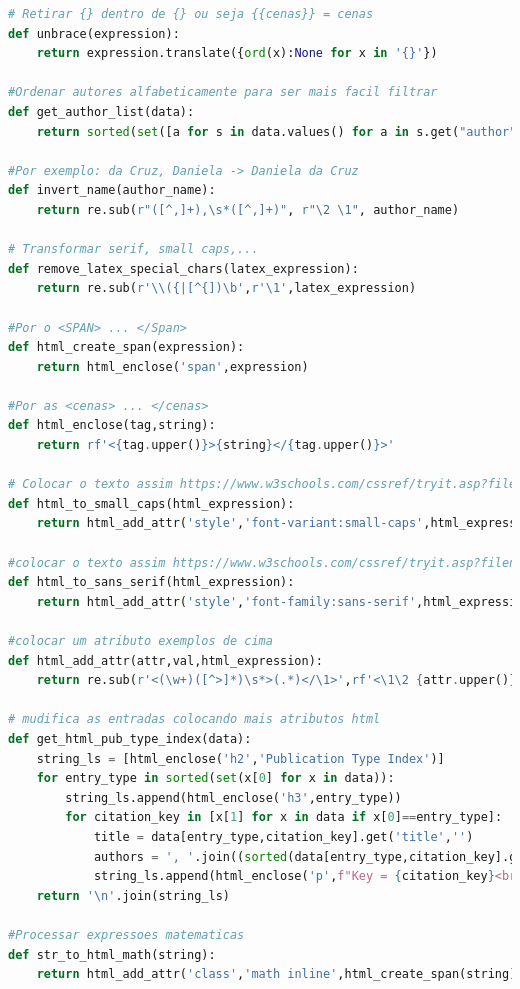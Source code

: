 \documentclass[11pt,a4paper]{report}
\begin{document}
\begin{lstlisting}[language=python]
# Retirar {} dentro de {} ou seja {{cenas}} = cenas
def unbrace(expression):
    return expression.translate({ord(x):None for x in '{}'})

#Ordenar autores alfabeticamente para ser mais facil filtrar
def get_author_list(data):
    return sorted(set([a for s in data.values() for a in s.get("author", [])]))

#Por exemplo: da Cruz, Daniela -> Daniela da Cruz
def invert_name(author_name):
    return re.sub(r"([^,]+),\s*([^,]+)", r"\2 \1", author_name)

# Transformar serif, small caps,... 
def remove_latex_special_chars(latex_expression):
    return re.sub(r'\\({|[^{])\b',r'\1',latex_expression)

#Por o <SPAN> ... </Span>
def html_create_span(expression):
    return html_enclose('span',expression)

#Por as <cenas> ... </cenas>
def html_enclose(tag,string):
    return rf'<{tag.upper()}>{string}</{tag.upper()}>'

# Colocar o texto assim https://www.w3schools.com/cssref/tryit.asp?filename=trycss_font-variant
def html_to_small_caps(html_expression):
    return html_add_attr('style','font-variant:small-caps',html_expression)

#colocar o texto assim https://www.w3schools.com/cssref/tryit.asp?filename=trycss_font-family
def html_to_sans_serif(html_expression):
    return html_add_attr('style','font-family:sans-serif',html_expression)

#colocar um atributo exemplos de cima
def html_add_attr(attr,val,html_expression):
    return re.sub(r'<(\w+)([^>]*)\s*>(.*)</\1>',rf'<\1\2 {attr.upper()}="{val}">\3</\1>',html_expression)

# mudifica as entradas colocando mais atributos html
def get_html_pub_type_index(data):
    string_ls = [html_enclose('h2','Publication Type Index')]
    for entry_type in sorted(set(x[0] for x in data)):
        string_ls.append(html_enclose('h3',entry_type))
        for citation_key in [x[1] for x in data if x[0]==entry_type]:
            title = data[entry_type,citation_key].get('title','')
            authors = ', '.join((sorted(data[entry_type,citation_key].get('author',''))))
            string_ls.append(html_enclose('p',f"Key = {citation_key}<br>Title = {fix_title(title)}<br>Autores = {authors}"))
    return '\n'.join(string_ls)

#Processar expressoes matematicas
def str_to_html_math(string):
    return html_add_attr('class','math inline',html_create_span(string))


\end{lstlisting}
\end{document}
